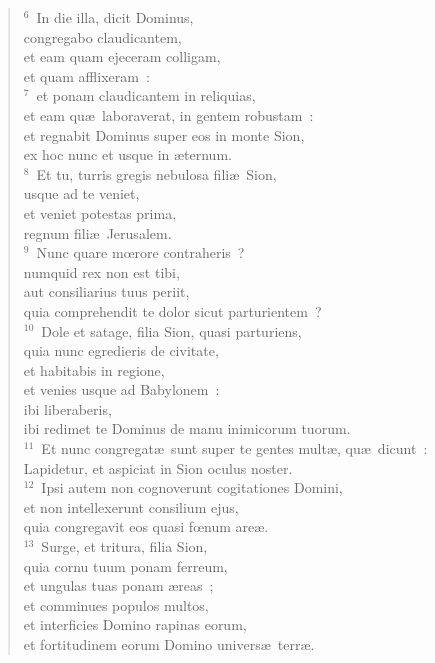 \begin{flushleft}\begin{verse}${}^{6}$~In die illa, dicit Dominus,\\ congregabo claudicantem,\\ et eam quam ejeceram colligam,\\ et quam afflixeram~:\\
${}^{7}$~et ponam claudicantem in reliquias,\\ et eam qu\ae\ laboraverat, in gentem robustam~:\\ et regnabit Dominus super eos in monte Sion,\\ ex hoc nunc et usque in \ae ternum.\\
${}^{8}$~Et tu, turris gregis nebulosa fili\ae\ Sion,\\ usque ad te veniet,\\ et veniet potestas prima,\\ regnum fili\ae\ Jerusalem.\\
${}^{9}$~Nunc quare mœrore contraheris~?\\ numquid rex non est tibi,\\ aut consiliarius tuus periit,\\ quia comprehendit te dolor sicut parturientem~?\\
${}^{10}$~Dole et satage, filia Sion, quasi parturiens,\\ quia nunc egredieris de civitate,\\ et habitabis in regione,\\ et venies usque ad Babylonem~:\\ ibi liberaberis,\\ ibi redimet te Dominus de manu inimicorum tuorum.\\
${}^{11}$~Et nunc congregat\ae\ sunt super te gentes mult\ae , qu\ae\ dicunt~:\\ Lapidetur, et aspiciat in Sion oculus noster.\\
${}^{12}$~Ipsi autem non cognoverunt cogitationes Domini,\\ et non intellexerunt consilium ejus,\\ quia congregavit eos quasi fœnum are\ae .\\
${}^{13}$~Surge, et tritura, filia Sion,\\ quia cornu tuum ponam ferreum,\\ et ungulas tuas ponam \ae reas~;\\ et comminues populos multos,\\ et interficies Domino rapinas eorum,\\ et fortitudinem eorum Domino univers\ae\ terr\ae .\end{verse}\end{flushleft}


